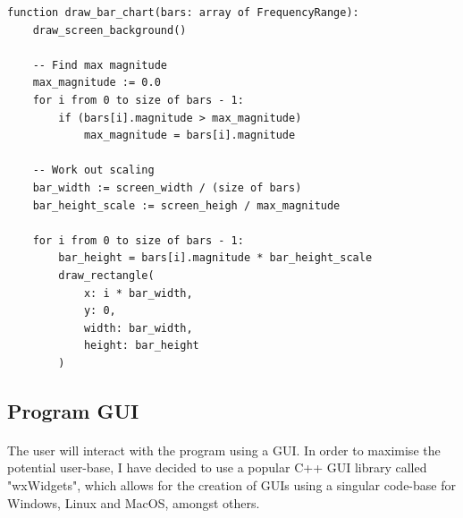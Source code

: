 \pagebreak
\begin{verbatim}
function draw_bar_chart(bars: array of FrequencyRange):
	draw_screen_background()

	-- Find max magnitude
	max_magnitude := 0.0
	for i from 0 to size of bars - 1:
		if (bars[i].magnitude > max_magnitude)
			max_magnitude = bars[i].magnitude

	-- Work out scaling
	bar_width := screen_width / (size of bars)
	bar_height_scale := screen_heigh / max_magnitude

	for i from 0 to size of bars - 1:
		bar_height = bars[i].magnitude * bar_height_scale
		draw_rectangle(
			x: i * bar_width,
			y: 0,
			width: bar_width,
			height: bar_height
		)
\end{verbatim}

\pagebreak

\pagebreak
\subsection{Program GUI}

\paragraph{}
The user will interact with the program using a GUI. In order to maximise the potential user-base, I have decided to use a popular C++ GUI library called "wxWidgets", which allows for the creation of GUIs using a singular code-base for Windows, Linux and MacOS, amongst others.

